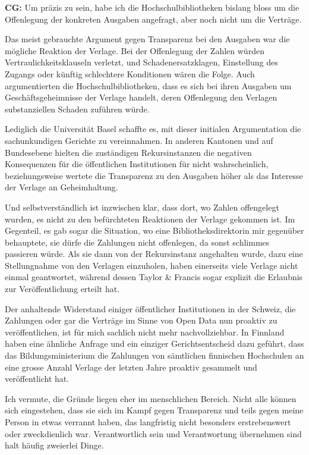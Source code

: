\documentclass[a4paper,
fontsize=11pt,
oneside,
numbers=noperiodatend,
parskip=half-,
bibliography=totoc,
final
]{scrartcl}
\begin{document}
\textbf{CG:} Um präzis zu sein, habe ich die Hochschulbibliotheken
bislang bloss um die Offenlegung der konkreten Ausgaben angefragt, aber
noch nicht um die Verträge.

Das meist gebrauchte Argument gegen Transparenz bei den Ausgaben war die
mögliche Reaktion der Verlage. Bei der Offenlegung der Zahlen würden
Vertraulichkeitsklauseln verletzt, und Schadenersatzklagen, Einstellung
des Zugangs oder künftig schlechtere Konditionen wären die Folge. Auch
argumentierten die Hochschulbibliotheken, dass es sich bei ihren
Ausgaben um Geschäftsgeheimnisse der Verlage handelt, deren Offenlegung
den Verlagen substanziellen Schaden zuführen würde.

Lediglich die Universität Basel schaffte es, mit dieser initialen
Argumentation die sachunkundigen Gerichte zu vereinnahmen. In anderen
Kantonen und auf Bundesebene hielten die zuständigen Rekursinstanzen die
negativen Konsequenzen für die öffentlichen Institutionen für nicht
wahrscheinlich, beziehungsweise wertete die Transparenz zu den Ausgaben
höher als das Interesse der Verlage an Geheimhaltung.

Und selbstverständlich ist inzwischen klar, dass dort, wo Zahlen
offengelegt wurden, es nicht zu den befürchteten Reaktionen der Verlage
gekommen ist. Im Gegenteil, es gab sogar die Situation, wo eine
Bibliotheksdirektorin mir gegenüber behauptete, sie dürfe die Zahlungen
nicht offenlegen, da sonst schlimmes passieren würde. Als sie dann von
der Rekursinstanz angehalten wurde, dazu eine Stellungnahme von den
Verlagen einzuholen, haben einerseits viele Verlage nicht einmal
geantwortet, während dessen Taylor \& Francis sogar explizit die
Erlaubnis zur Veröffentlichung erteilt hat.

Der anhaltende Widerstand einiger öffentlicher Institutionen in der
Schweiz, die Zahlungen oder gar die Verträge im Sinne von Open Data nun
proaktiv zu veröffentlichen, ist für mich sachlich nicht mehr
nachvollziehbar. In Finnland haben eine ähnliche Anfrage und ein
einziger Gerichtsentscheid dazu geführt, dass das Bildungsministerium
die Zahlungen von sämtlichen finnischen Hochschulen an eine grosse
Anzahl Verlage der letzten Jahre proaktiv gesammelt und veröffentlicht
hat.

Ich vermute, die Gründe liegen eher im menschlichen Bereich. Nicht alle
können sich eingestehen, dass sie sich im Kampf gegen Transparenz und
teils gegen meine Person in etwas verrannt haben, das langfristig nicht
besonders erstrebenswert oder zweckdienlich war. Verantwortlich sein und
Verantwortung übernehmen sind halt häufig zweierlei Dinge.
\end{document}
